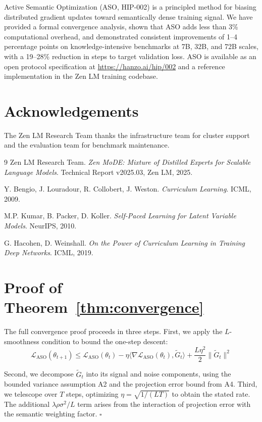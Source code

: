 \documentclass[11pt,a4paper]{article}
\begin{document}
Active Semantic Optimization (ASO, HIP-002) is a principled method for biasing
distributed gradient updates toward semantically dense training signal. We have provided
a formal convergence analysis, shown that ASO adds less than 3\% computational overhead,
and demonstrated consistent improvements of 1--4 percentage points on knowledge-intensive
benchmarks at 7B, 32B, and 72B scales, with a 19--28\% reduction in steps to target
validation loss. ASO is available as an open protocol specification at
\url{https://hanzo.ai/hip/002} and a reference implementation in the Zen LM training
codebase.

\section*{Acknowledgements}
The Zen LM Research Team thanks the infrastructure team for cluster support and the
evaluation team for benchmark maintenance.

\begin{thebibliography}{9}
Zen LM Research Team.
\textit{Zen MoDE: Mixture of Distilled Experts for Scalable Language Models}.
Technical Report v2025.03, Zen LM, 2025.

Y. Bengio, J. Louradour, R. Collobert, J. Weston.
\textit{Curriculum Learning}.
ICML, 2009.

M.P. Kumar, B. Packer, D. Koller.
\textit{Self-Paced Learning for Latent Variable Models}.
NeurIPS, 2010.

G. Hacohen, D. Weinshall.
\textit{On the Power of Curriculum Learning in Training Deep Networks}.
ICML, 2019.
\end{thebibliography}

\appendix
\section{Proof of Theorem~\ref{thm:convergence}}

The full convergence proof proceeds in three steps. First, we apply the $L$-smoothness
condition to bound the one-step descent:
\begin{equation}
    \mathcal{L}_{\text{ASO}}(\theta_{t+1}) \leq
    \mathcal{L}_{\text{ASO}}(\theta_t)
    - \eta \langle \nabla \mathcal{L}_{\text{ASO}}(\theta_t), \tilde{G}_t \rangle
    + \frac{L\eta^2}{2}\|\tilde{G}_t\|^2
\end{equation}

Second, we decompose $\tilde{G}_t$ into its signal and noise components, using the
bounded variance assumption A2 and the projection error bound from A4. Third, we
telescope over $T$ steps, optimizing $\eta = \sqrt{1/(LT)}$ to obtain the stated rate.
The additional $\lambda \rho \sigma^2 / L$ term arises from the interaction of
projection error with the semantic weighting factor. $\square$
\end{document}
